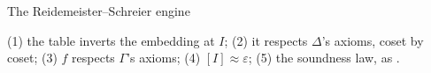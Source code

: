 \begin{frame}{The Reidemeister--Schreier engine \InPaper}
\begin{code}
\AgdaSpace{}%
\AgdaOperator{\AgdaInductiveConstructor{[}}\AgdaSpace{}%
\AgdaSpace{}%
\AgdaOperator{\AgdaInductiveConstructor{]ʷ}}\AgdaSpace{}%
\AgdaSpace{}%
\AgdaSymbol{(}\AgdaSpace{}%
\AgdaSymbol{)}\AgdaSpace{}%
\AgdaSpace{}%
\AgdaSpace{}%
\AgdaOperator{\AgdaPostulate{[}}\AgdaSpace{}%
\AgdaSpace{}%
\AgdaOperator{\AgdaPostulate{]}}\AgdaSymbol{)}%
\>[83]\<%
\end{code}
\begin{code}[hide]%
%
\>[2]\<%
\end{code}
\vspace{-4pt}
{\small (1) the table inverts the embedding at $I$;\; (2) it respects $\Delta$'s
axioms, coset by coset;\; (3) $f$ respects $\Gamma$'s axioms;\; (4) $[I]\approx\varepsilon$;\;
(5) the soundness law, as .}
\end{frame}


